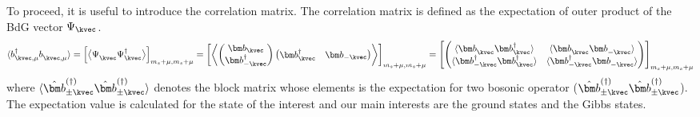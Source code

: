 To proceed, it is useful to introduce the correlation matrix.
The correlation matrix is defined as the expectation of outer product of the BdG vector $\Psi_{\kvec}$.
\begin{equation}
    \langle b^{\dagger}_{\kvec, \mu} b_{\kvec, \mu}^{\phantom \dagger} \rangle  
    = \Big[ \big\langle \Psi_{\kvec}^{\phantom \dagger} \Psi_{\kvec}^{\dagger} \big\rangle \Big]_{m_{s} + \mu, m_{s} + \mu} 
    = \left[
        \left\langle 
        \begin{pmatrix}
            {\bm b}_{\kvec} \\ {\bm b}^{\dagger}_{- \kvec}
        \end{pmatrix}
        \begin{pmatrix}
            {\bm b}_{\kvec}^{\dagger} & {\bm b}_{- \kvec}
        \end{pmatrix}
        \right\rangle
    \right]_{m_{s} + \mu, m_{s} + \mu} 
    = \left[
        \begin{pmatrix}
            \langle  {\bm b}_{\kvec}^{\phantom \dagger} {\bm b}_{\kvec}^{\dagger}  \rangle
            & \langle  {\bm b}_{\kvec}^{\phantom \dagger} {\bm b}_{- \kvec}^{\phantom \dagger}  \rangle
            \\ 
            \langle  {\bm b}^{\dagger}_{- \kvec} {\bm b}_{\kvec}^{\dagger}  \rangle
            & \langle  {\bm b}^{\dagger}_{- \kvec} {\bm b}_{- \kvec}^{\phantom \dagger}  \rangle
        \end{pmatrix}
    \right]_{m_{s} + \mu, m_{s} + \mu}
\end{equation}
where $\langle \hat{\bm b}_{\pm \kvec}^{(\dagger)} \hat{\bm b}_{\pm \kvec}^{(\dagger)} \rangle $ denotes the block matrix whose elements is the expectation for two bosonic operator ($\hat{\bm b}_{\pm \kvec}^{(\dagger)} \hat{\bm b}_{\pm \kvec}^{(\dagger)}$).
The expectation value is calculated for the state of the interest and our main interests are the ground states and the Gibbs states. 


